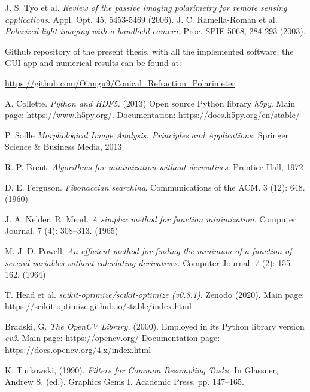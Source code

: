 \documentclass[11pt, a4paper, twoside]{article} %
\begin{document}
\begin{thebibliography}{1}
J. S. Tyo et al. {\em  Review of the passive imaging polarimetry for remote sensing applications}. Appl. Opt. 45, 5453-5469 (2006).
J. C. Ramella-Roman et al. {\em Polarized light imaging with a handheld camera}. Proc. SPIE 5068, 284-293 (2003).

Github repository of the present thesis, with all the implemented software, the GUI app and numerical results can be found at:

\href{https://github.com/Oiangu9/Conical_Refraction_Polarimeter}{https://github.com/Oiangu9/Conical\_Refraction\_Polarimeter}


A. Collette. {\em Python and HDF5.} (2013) Open source Python library {\em h5py}. Main page: \href{https://www.h5py.org/}{https://www.h5py.org/}. Documentation: \href{https://docs.h5py.org/en/stable/}{https://docs.h5py.org/en/stable/}

P. Soille {\em Morphological Image Analysis: Principles and Applications.} Springer Science \& Business Media, 2013

R. P. Brent. {\em Algorithms for minimization without derivatives.} Prentice-Hall, 1972

D. E. Ferguson. {\em Fibonaccian searching}. Communications of the ACM. 3 (12): 648. (1960)

J. A. Nelder, R. Mead. {\em A simplex method for function minimization}. Computer Journal. 7 (4): 308–313. (1965)

M. J. D.  Powell. {\em An efficient method for finding the minimum of a function of several variables without calculating derivatives.} Computer Journal. 7 (2): 155–162. (1964)

T. Head et al. {\em scikit-optimize/scikit-optimize (v0.8.1)}. Zenodo (2020). Main page: \href{https://scikit-optimize.github.io/stable/index.html}{https://scikit-optimize.github.io/stable/index.html}

Bradski, G. {\em The OpenCV Library.} (2000). Employed in its Python library version {\em cv2}. Main page: \href{https://opencv.org/}{https://opencv.org/} Documentation page: \href{https://docs.opencv.org/4.x/index.html}{https://docs.opencv.org/4.x/index.html}

K. Turkowski, (1990). {\em Filters for Common Resampling Tasks.} In Glassner, Andrew S. (ed.). Graphics Gems I. Academic Press. pp. 147–165.


\end{thebibliography}
\end{document}
